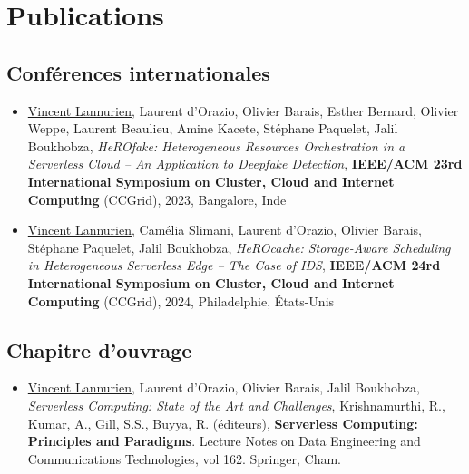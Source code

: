 \chapter*{Publications}

\section*{Conférences internationales}

\begin{itemize}
    \item \underline{Vincent Lannurien}, Laurent d'Orazio, Olivier Barais, Esther Bernard, Olivier Weppe, Laurent Beaulieu, Amine Kacete, Stéphane Paquelet, Jalil Boukhobza, \textit{{\NoAutoSpacing HeROfake:} Heterogeneous Resources Orchestration in a Serverless Cloud -- An Application to Deepfake Detection}, \textbf{IEEE/ACM 23rd International Symposium on Cluster, Cloud and Internet Computing} (CCGrid), 2023, Bangalore, Inde
    \item \underline{Vincent Lannurien}, Camélia Slimani, Laurent d'Orazio, Olivier Barais, Stéphane Paquelet, Jalil Boukhobza, \textit{{\NoAutoSpacing HeROcache:} Storage-Aware Scheduling in Heterogeneous Serverless Edge – The Case of IDS}, \textbf{IEEE/ACM 24rd International Symposium on Cluster, Cloud and Internet Computing} (CCGrid), 2024, Philadelphie, États-Unis
\end{itemize}

\section*{Chapitre d'ouvrage}

\begin{itemize}
    \item \underline{Vincent Lannurien}, Laurent d'Orazio, Olivier Barais, Jalil Boukhobza, \textit{{\NoAutoSpacing Serverless Computing:} State of the Art and Challenges}, Krishnamurthi, R., Kumar, A., Gill, S.S., Buyya, R. (éditeurs), \textbf{{\NoAutoSpacing Serverless Computing:} Principles and Paradigms}. Lecture Notes on Data Engineering and Communications Technologies, vol 162. Springer, Cham.
\end{itemize}
